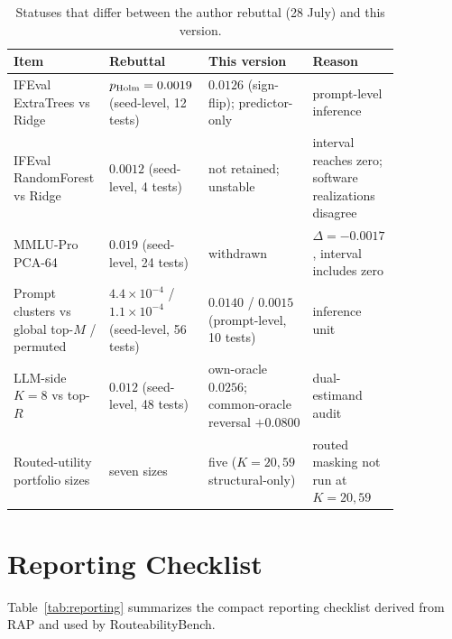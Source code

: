 \documentclass{article}
\begin{document}
\begin{table}[htbp]
  \caption{Statuses that differ between the author rebuttal (28 July) and this version.}
  \label{tab:app-rebuttal}
  \centering
  \scriptsize
  \begin{tabular}{>{\raggedright\arraybackslash}p{0.19\linewidth}>{\raggedright\arraybackslash}p{0.21\linewidth}>{\raggedright\arraybackslash}p{0.26\linewidth}>{\raggedright\arraybackslash}p{0.19\linewidth}}
    \toprule
    Item & Rebuttal & This version & Reason \\
    \midrule
    IFEval ExtraTrees vs Ridge & $p_{\rm Holm}=0.0019$ (seed-level, 12 tests) & $0.0126$ (sign-flip); predictor-only & prompt-level inference \\
    IFEval RandomForest vs Ridge & $0.0012$ (seed-level, 4 tests) & not retained; unstable & interval reaches zero; software realizations disagree \\
    MMLU-Pro PCA-64 & $0.019$ (seed-level, 24 tests) & withdrawn & $\Delta=-0.0017$, interval includes zero \\
    Prompt clusters vs global top-$M$ / permuted & $4.4{\times}10^{-4}$ / $1.1{\times}10^{-4}$ (seed-level, 56 tests) & $0.0140$ / $0.0015$ (prompt-level, 10 tests) & inference unit \\
    LLM-side $K=8$ vs top-$R$ & $0.012$ (seed-level, 48 tests) & own-oracle $0.0256$; common-oracle reversal $+0.0800$ & dual-estimand audit \\
    Routed-utility portfolio sizes & seven sizes & five ($K=20,59$ structural-only) & routed masking not run at $K=20,59$ \\
    \bottomrule
  \end{tabular}
\end{table}

\section{Reporting Checklist}
\label{app:reporting-checklist}

Table~\ref{tab:reporting} summarizes the compact reporting checklist derived from RAP and used by RouteabilityBench.
\end{document}
